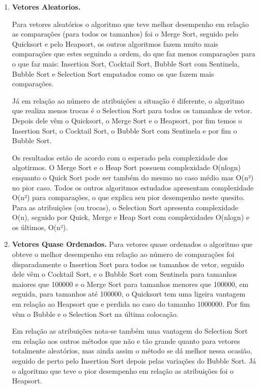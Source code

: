 \documentclass{article}
\begin{document}
\begin{enumerate}
    \item \textbf{Vetores Aleatorios.}
    
     Para vetores aleatórios o algoritmo que teve melhor desempenho em relação as comparações (para todos os tamanhos) foi o Merge Sort, seguido pelo Quicksort e pelo Heapsort, os outros algoritmos fazem muito mais comparações que estes seguindo a ordem, do que faz menos comparações para o que faz mais: Insertion Sort, Cocktail Sort, Bubble Sort com Sentinela, Bubble Sort e Selection Sort empatados como os que fazem mais comparações. 
   
     Já em relação ao número de atribuições a situação é diferente, o algoritmo que realiza menos trocas é o Selection Sort para todos os tamanhos de vetor. Depois dele vêm o Quicksort, o Merge Sort e o Heapsort, por fim temos o Insertion Sort, o Cocktail Sort, o Bubble Sort com Sentinela e por fim o Bubble Sort.
     
     Os resultados estão de acordo com o esperado pela complexidade dos algotirmos. O Merge Sort e o Heap Sort possuem complexidade O(nlogn) enquanto o Quick Sort pode ser também do mesmo no caso médio mas O(n²) no pior caso. Todos os outros algoritmos estudados apresentam complexidade O(n²) para comparações, o que explica seu pior desempenho neste quesito. Para as atribuições (ou trocas), o Selection Sort apresenta complexidade O(n), seguido por Quick, Merge e Heap Sort com complexidades O(nlogn) e os últimos, O(n²).
     
    
    \item \textbf{Vetores Quase Ordenados.}
    Para vetores quase ordenados o algoritmo que obteve o melhor desempenho em relação ao número de comparações foi disparadamente o Insertion Sort para todos os tamanhos de vetor, seguido dele vêm o Cocktail Sort, e o Bubble Sort com Sentinela para tamanhos maiores que 100000 e  o Merge Sort para tamanhos menores que 100000, em seguida, para tamanhos até 100000, o Quicksort tem uma ligeira vantagem em relação ao Heapsort que e perdida no caso do tamanho 1000000. Por fim vêm o Bubble e o Selection Sort na última colocação.
    
	Em relação as atribuições nota-se também uma vantagem do Selection Sort em relação aos outros métodos que não e tão grande quanto para vetores totalmente aleatórios, mas ainda assim o método se dá melhor nessa ocasião, seguido de perto pelo Insertion Sort depois pelas variações do Bubble Sort. Já o algoritmo que teve o pior desempenho em relação as atribuições foi o Heapsort.
	

\end{enumerate}
\end{document}
